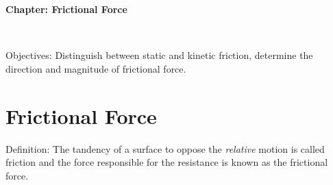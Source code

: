 \documentclass[10pt]{article}
\date{2014-6-22}
\begin{document}
\begin{center}
\begin{Large}\textbf{Chapter: Frictional Force}\end{Large} \\
\smallskip
\end{center}
Objectives: Distinguish between static and kinetic friction, determine the direction and magnitude of frictional force.
\section{Frictional Force}
Definition: The tandency of a surface to oppose the \emph{relative} motion is called friction and the force responsible for the resistance is known as the frictional force. 
\end{document}
